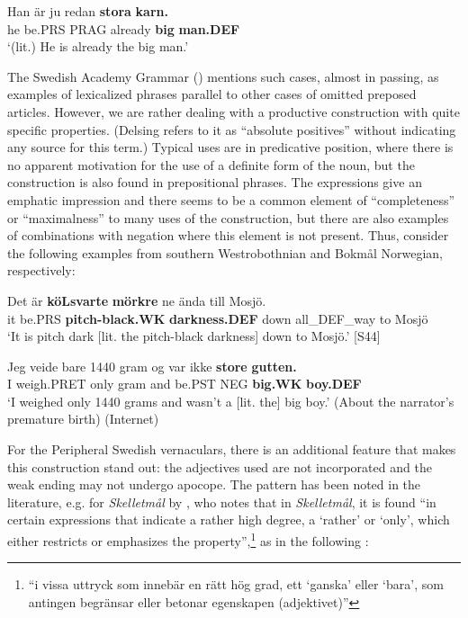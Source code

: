 \ea\label{}
\gll Han  är  ju  redan  \textbf{stora}\textbf{  karn.}\\
he  be.PRS  PRAG  already  \textbf{big} \textbf{man.DEF}\\
\glt ‘(lit.) He is already the big man.’
\z

The Swedish Academy Grammar (\citet[3:20]{TelemanEtAl1999}) mentions such cases, almost in passing, as examples of lexicalized phrases parallel to other cases of omitted preposed articles. However, we are rather dealing with a productive construction with quite specific properties. (Delsing refers to it as “absolute positives” without indicating any source for this term.) Typical uses are in predicative position, where there is no apparent motivation for the use of a definite form of the noun, but the construction is also found in prepositional phrases. The expressions give an emphatic impression and there seems to be a common element of “completeness” or “maximalness” to many uses of the construction, but there are also examples of combinations with negation where this element is not present. Thus, consider the following examples from southern Westrobothnian and Bokmål Norwegian, respectively: 

\ea\label{}
\gll Det  är  \textbf{köLsvarte}\textbf{  mörkre} ne  ända  till  Mosjö.  \\
it  be.PRS  \textbf{pitch-black.WK} \textbf{darkness.DEF} down  all\_DEF\_way  to  Mosjö  \\
\glt ‘It is pitch dark [lit. the pitch-black darkness] down to Mosjö.’ [S44]
\z

\ea\label{}
\gll Jeg  veide  bare  1440  gram  og  var  ikke  \textbf{store} \textbf{gutten.}\\
I  weigh.PRET  only    gram  and  be.PST  NEG  \textbf{big.WK} \textbf{boy.DEF}\\
\glt ‘I weighed only 1440 grams and wasn’t a [lit. the] big boy.’ (About the narrator’s premature birth) (Internet) 
\z

For the Peripheral Swedish vernaculars, there is an additional feature that makes this construction stand out: the adjectives used are not incorporated and the weak ending may not undergo apocope. The pattern has been noted in the literature, e.g. for \textit{Skelletmål} by \citet[34]{Marklund1976}, who notes that in \textit{Skelletmål}, it is found “in certain expressions that indicate a rather high degree, a ‘rather’ or ‘only’, which either restricts or emphasizes the property”,\footnote{ “i vissa uttryck som innebär en rätt hög grad, ett ‘ganska’ eller ‘bara’, som antingen begränsar eller betonar egenskapen (adjektivet)”} as in the following \label{tab:4.1}:

